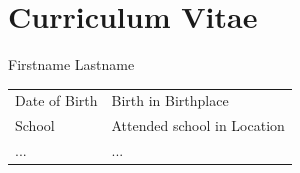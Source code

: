 \chapter*{Curriculum Vitae}

Firstname Lastname

\vspace*{2.0cm}

\begin{tabular}{ll}

Date of Birth & Birth in Birthplace \\[1.5ex]
School & Attended school in Location \\[1.5ex]
 ... & ...
\end{tabular}
